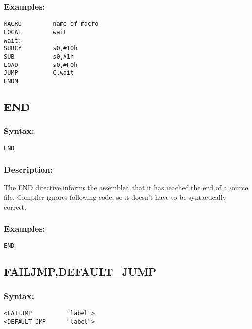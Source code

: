        \subsubsection{Examples:}
        {
            \usecodefont
            \verb'MACRO         name_of_macro'\\
            \verb'LOCAL         wait'\\
            \verb'wait:'\\
            \verb'SUBCY         s0,#10h'\\
            \verb'SUB           s0,#1h' \\
            \verb'LOAD          s0,#F0h'\\
            \verb'JUMP          C,wait'\\
            \verb'ENDM'\\
        }

    \subsection{END}
        \subsubsection{Syntax:}
            \verb'END'

        \subsubsection{Description:}
            The END directive informs the assembler, that it has reached the end of a source file. Compiler ignores following code, so it doesn't have to be syntactically correct.

        \subsubsection{Examples:}
            {
                \usecodefont
                \verb'END'
            }

    \subsection{FAILJMP,DEFAULT\_JUMP}
        \subsubsection{Syntax:}
            {
                \usecodefont
                \verb'<FAILJMP          "label">'\\
                \verb'<DEFAULT_JMP      "label">'
            }

